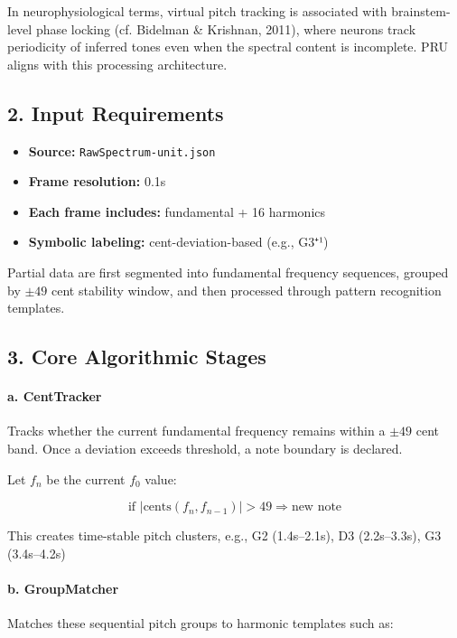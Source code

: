 In neurophysiological terms, virtual pitch tracking is associated with brainstem-level phase locking (cf. Bidelman \& Krishnan, 2011), where neurons track periodicity of inferred tones even when the spectral content is incomplete. PRU aligns with this processing architecture.

\subsection*{2. Input Requirements}

\begin{itemize}
    \item \textbf{Source:} \texttt{RawSpectrum-unit.json}
    \item \textbf{Frame resolution:} 0.1s
    \item \textbf{Each frame includes:} fundamental + 16 harmonics
    \item \textbf{Symbolic labeling:} cent-deviation-based (e.g., G3⁺¹)
\end{itemize}

Partial data are first segmented into fundamental frequency sequences, grouped by $\pm49$ cent stability window, and then processed through pattern recognition templates.

\subsection*{3. Core Algorithmic Stages}

\paragraph{a. CentTracker}

Tracks whether the current fundamental frequency remains within a $\pm49$ cent band. Once a deviation exceeds threshold, a note boundary is declared.

Let $f_n$ be the current $f_0$ value:

\[
\text{if } \left| \text{cents}(f_n, f_{n-1}) \right| > 49 \Rightarrow \text{new note}
\]

This creates time-stable pitch clusters, e.g., G2 (1.4s–2.1s), D3 (2.2s–3.3s), G3 (3.4s–4.2s)

\paragraph{b. GroupMatcher}

Matches these sequential pitch groups to harmonic templates such as:

